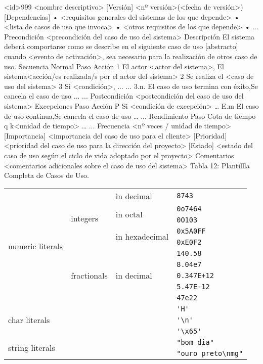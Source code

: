  
<id>999	<nombre descriptivo>
[Versión]	<nº versión>(<fecha de versión>)
[Dependencias]	•	<requisitos generales del sistemas de los que depende>
•	<lista de casos de uso que invoca>
•	<otros requisitos de los que depende>
•	...
Precondición	<precondición del caso de uso del sistema>
Descripción	El sistema deberá comportarse como se describe en el siguiente caso de uso [abstracto] cuando {<evento de activación>, sea necesario para la realización de otros caso de uso}.
Secuencia Normal	Paso	Acción
	1	{El actor <actor del sistema>, El sistema}<acción/es realizada/s por el actor del sistema>
	2	Se realiza el <caso de uso del sistema>
	3	Si <condición>,
		...	...
		3.n.	{El caso de uso termina con éxito,Se cancela el caso de uso}
	...	...
Postcondición	<postcondición del caso de uso del sistema>
Excepciones	Paso	Acción
	P	Si <condición de excepción>
		…	
		E.m	{El caso de uso continua,Se cancela el caso de uso}
	…	...
Rendimiento	Paso	Cota de tiempo
	q	k<unidad de tiempo>
	…	...
Frecuencia	<nº veces / unidad de tiempo>
[Importancia]	<importancia del caso de uso para el cliente>
[Prioridad]	<prioridad del caso de uso para la dirección del proyecto>
[Estado]	<estado del caso de uso según el ciclo de vida adoptado por el proyecto>
Comentarios	<comentarios adicionales sobre el caso de uso del sistema>
Tabla 12: Plantillla Completa de Casos de Uso.


\begin{tabular}{|l|l|l|l|}\hline
  \multirow{10}{*}{numeric literals} & \multirow{5}{*}{integers} & in decimal & \verb|8743| \\ \cline{3-4}
  & & \multirow{2}{*}{in octal} & \verb|0o7464| \\ \cline{4-4}
  & & & \verb|0O103| \\ \cline{3-4}
  & & \multirow{2}{*}{in hexadecimal} & \verb|0x5A0FF| \\ \cline{4-4}
  & & & \verb|0xE0F2| \\ \cline{2-4}
  & \multirow{5}{*}{fractionals} & \multirow{5}{*}{in decimal} & \verb|140.58| \\ \cline{4-4}
  & & & \verb|8.04e7| \\ \cline{4-4}
  & & & \verb|0.347E+12| \\ \cline{4-4}
  & & & \verb|5.47E-12| \\ \cline{4-4}
  & & & \verb|47e22| \\ \cline{1-4}
  \multicolumn{3}{|l|}{\multirow{3}{*}{char literals}} & \verb|'H'| \\ \cline{4-4}
  & & & \verb|'\n'| \\ \cline{4-4}
  & & & \verb|'\x65'| \\ \cline{1-4}
  \multicolumn{3}{|l|}{\multirow{2}{*}{string literals}} & \verb|"bom dia"| \\ \cline{4-4}
  & & & \verb|"ouro preto\nmg"| \\ \cline{1-4}
\end{tabular}







